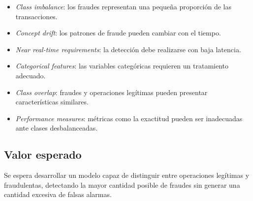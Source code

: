 \begin{itemize}
\item \textit{Class imbalance}: los fraudes representan una pequeña proporción de las transacciones.
\item \textit{Concept drift}: los patrones de fraude pueden cambiar con el tiempo.
\item \textit{Near real-time requirements}: la detección debe realizarse con baja latencia.
\item \textit{Categorical features}: las variables categóricas requieren un tratamiento adecuado.
\item \textit{Class overlap}: fraudes y operaciones legítimas pueden presentar características similares.
\item \textit{Performance measures}: métricas como la exactitud pueden ser inadecuadas ante clases desbalanceadas.
\end{itemize}

\subsection{Valor esperado}

Se espera desarrollar un modelo capaz de distinguir entre operaciones legítimas y fraudulentas, detectando la mayor cantidad posible de fraudes sin generar una cantidad excesiva de falsas alarmas.
